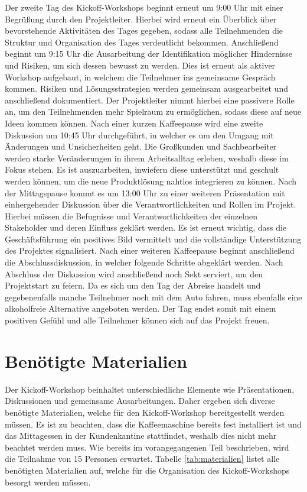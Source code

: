 Der zweite Tag des Kickoff-Workshops beginnt erneut um 9:00 Uhr mit einer Begrüßung durch den Projektleiter. Hierbei wird erneut ein Überblick über bevorstehende Aktivitäten des Tages gegeben, sodass alle Teilnehmenden die Struktur und Organisation des Tages verdeutlicht bekommen. Anschließend beginnt um 9:15 Uhr die Ausarbeitung der Identifikation möglicher Hindernisse und Risiken, um sich dessen bewusst zu werden. Dies ist erneut als aktiver Workshop aufgebaut, in welchem die Teilnehmer ins gemeinsame Gespräch kommen. Risiken und Lösungsstrategien werden gemeinsam ausgearbeitet und anschließend dokumentiert. Der Projektleiter nimmt hierbei eine passivere Rolle an, um den Teilnehmenden mehr Spielraum zu ermöglichen, sodass diese auf neue Ideen kommen können. Nach einer kurzen Kaffeepause wird eine zweite Diskussion um 10:45 Uhr durchgeführt, in welcher es um den Umgang mit Änderungen und Unsicherheiten geht. Die Großkunden und Sachbearbeiter werden starke Veränderungen in ihrem Arbeitsalltag erleben, weshalb diese im Fokus stehen. Es ist auszuarbeiten, inwiefern diese unterstützt und geschult werden können, um die neue Produktlösung nahtlos integrieren zu können. Nach der Mittagspause kommt es um 13:00 Uhr zu einer weiteren Präsentation mit einhergehender Diskussion über die Verantwortlichkeiten und Rollen im Projekt. Hierbei müssen die Befugnisse und Verantwortlichkeiten der einzelnen Stakeholder und deren Einfluss geklärt werden. Es ist erneut wichtig, dass die Geschäftsführung ein positives Bild vermittelt und die vollständige Unterstützung des Projektes signalisiert. Nach einer weiteren Kaffeepause beginnt anschließend die Abschlussdiskussion, in welcher folgende Schritte abgeklärt werden. Nach Abschluss der Diskussion wird anschließend noch Sekt serviert, um den Projektstart zu feiern. Da es sich um den Tag der Abreise handelt und gegebenenfalls manche Teilnehmer noch mit dem Auto fahren, muss ebenfalls eine alkoholfreie Alternative angeboten werden. Der Tag endet somit mit einem positiven Gefühl und alle Teilnehmer können sich auf das Projekt freuen.

\section{Benötigte Materialien}
Der Kickoff-Workshop beinhaltet unterschiedliche Elemente wie Präsentationen, Diskussionen und gemeinsame Ausarbeitungen. Daher ergeben sich diverse benötigte Materialien, welche für den Kickoff-Workshop bereitgestellt werden müssen. Es ist zu beachten, dass die Kaffeemaschine bereits fest installiert ist und das Mittagessen in der Kundenkantine stattfindet, weshalb dies nicht mehr beachtet werden muss. Wie bereits im vorangegangenen Teil beschrieben, wird die Teilnahme von 15 Personen erwartet. Tabelle \ref{tab:materialien} listet alle benötigten Materialien auf, welche für die Organisation des Kickoff-Workshops besorgt werden müssen.
\vspace{10pt}

